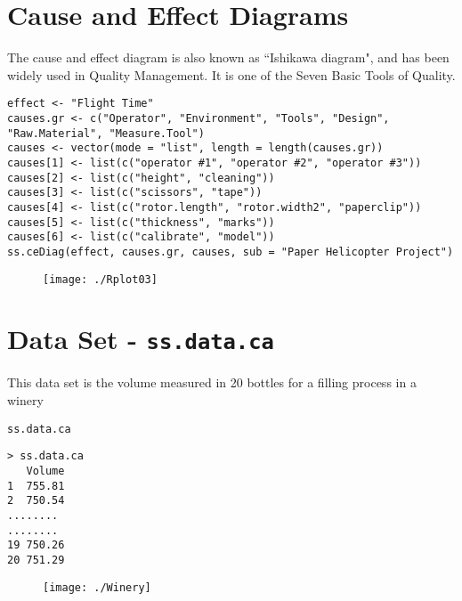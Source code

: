 \documentclass[11pt]{article} %
\begin{document}
\tableofcontents
\newpage
\section{Cause and Effect Diagrams}
The cause and effect diagram is also known as ``Ishikawa diagram", and has been widely used in
Quality Management. It is one of the Seven Basic Tools of Quality.
\begin{framed}
\begin{verbatim}
effect <- "Flight Time"
causes.gr <- c("Operator", "Environment", "Tools", "Design",
"Raw.Material", "Measure.Tool")
causes <- vector(mode = "list", length = length(causes.gr))
causes[1] <- list(c("operator #1", "operator #2", "operator #3"))
causes[2] <- list(c("height", "cleaning"))
causes[3] <- list(c("scissors", "tape"))
causes[4] <- list(c("rotor.length", "rotor.width2", "paperclip"))
causes[5] <- list(c("thickness", "marks"))
causes[6] <- list(c("calibrate", "model"))
ss.ceDiag(effect, causes.gr, causes, sub = "Paper Helicopter Project")
\end{verbatim}
\end{framed}
\begin{figure}[h!]
\centering
\texttt{[image: ./Rplot03]}
\caption{}
\label{fig:Rplot03}
\end{figure}
\newpage
\section{Data Set - \texttt{ss.data.ca} }
This data set is the volume measured in 20 bottles for a filling process in a winery
\begin{framed}
\begin{verbatim}
ss.data.ca
\end{verbatim}
\end{framed}

\begin{verbatim}
> ss.data.ca
   Volume
1  755.81
2  750.54
........
........
19 750.26
20 751.29
\end{verbatim}
\begin{figure}[h!]
\centering
\texttt{[image: ./Winery]}
\caption{}
\label{fig:Winery}
\end{figure}

\newpage
\end{document}
